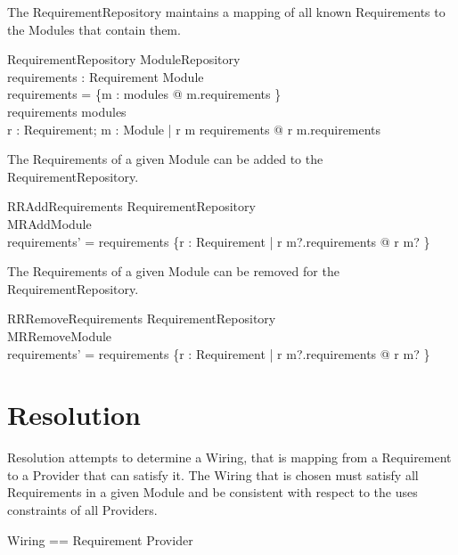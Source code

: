 \documentclass[a4paper,9pt]{article}
\begin{document}
The RequirementRepository maintains a mapping of all known Requirements to the Modules that contain them.

\begin{schema}{RequirementRepository}
 ModuleRepository \\
 requirements : Requirement \pfun Module \\
\where
 \dom requirements = \bigcup \{m : modules @ m.requirements \} \\ 
 \ran requirements \subseteq modules \\
 \forall r : Requirement; m : Module | r \mapsto m \in requirements @ r \in m.requirements
\end{schema}

The Requirements of a given Module can be added to the RequirementRepository.

\begin{schema}{RRAddRequirements}
 \Delta RequirementRepository \\
 MRAddModule \\
\where
 requirements' = requirements \cup \{r : Requirement  | r \in m?.requirements @ r \mapsto m? \}
\end{schema}

The Requirements of a given Module can be removed for the RequirementRepository.

\begin{schema}{RRRemoveRequirements}
 \Delta RequirementRepository \\
 MRRemoveModule \\
\where
 requirements' = requirements \setminus \{r : Requirement  | r \in m?.requirements @ r \mapsto m? \}
\end{schema}

\clearpage
\section{Resolution}
\label{cha:resolution}

Resolution attempts to determine a Wiring, that is mapping from a Requirement to a Provider that can satisfy it. The Wiring that is chosen must satisfy all Requirements in a given Module and be consistent with respect to the uses constraints of all Providers.

\begin{zed}
 Wiring == Requirement \pfun Provider
\end{zed}
\end{document}
